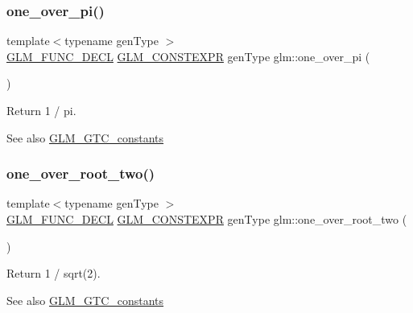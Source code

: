 \subsubsection{\texorpdfstring{one\+\_\+over\+\_\+pi()}{one\_over\_pi()}}
{\footnotesize\ttfamily template$<$typename gen\+Type $>$ \\
\hyperlink{setup_8hpp_ab2d052de21a70539923e9bcbf6e83a51}{G\+L\+M\+\_\+\+F\+U\+N\+C\+\_\+\+D\+E\+CL} \hyperlink{setup_8hpp_a08b807947b47031d3a511f03f89645ad}{G\+L\+M\+\_\+\+C\+O\+N\+S\+T\+E\+X\+PR} gen\+Type glm\+::one\+\_\+over\+\_\+pi (\begin{DoxyParamCaption}{ }\end{DoxyParamCaption})}

Return 1 / pi. \begin{DoxySeeAlso}{See also}
\hyperlink{group__gtc__constants}{G\+L\+M\+\_\+\+G\+T\+C\+\_\+constants} 
\end{DoxySeeAlso}
\mbox{\label{group__gtc__constants_ga788fa23a0939bac4d1d0205fb4f35818}} 
\subsubsection{\texorpdfstring{one\+\_\+over\+\_\+root\+\_\+two()}{one\_over\_root\_two()}}
{\footnotesize\ttfamily template$<$typename gen\+Type $>$ \\
\hyperlink{setup_8hpp_ab2d052de21a70539923e9bcbf6e83a51}{G\+L\+M\+\_\+\+F\+U\+N\+C\+\_\+\+D\+E\+CL} \hyperlink{setup_8hpp_a08b807947b47031d3a511f03f89645ad}{G\+L\+M\+\_\+\+C\+O\+N\+S\+T\+E\+X\+PR} gen\+Type glm\+::one\+\_\+over\+\_\+root\+\_\+two (\begin{DoxyParamCaption}{ }\end{DoxyParamCaption})}

Return 1 / sqrt(2). \begin{DoxySeeAlso}{See also}
\hyperlink{group__gtc__constants}{G\+L\+M\+\_\+\+G\+T\+C\+\_\+constants} 
\end{DoxySeeAlso}
\mbox{\label{group__gtc__constants_ga7c922b427986cbb2e4c6ac69874eefbc}} 
